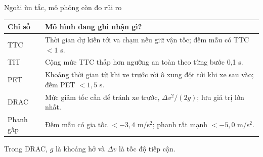 \documentclass[aspectratio=169,10pt]{beamer}
\begin{document}
  \begin{frame}{Ngoài ùn tắc, mô phỏng còn đo rủi ro}
    \relax
    \small
    \begin{tabular}{@{}P{2.3cm}P{10.3cm}@{}}
      \toprule
      Chỉ số & Mô hình đang ghi nhận gì?\\
      \midrule
      TTC & Thời gian dự kiến tới va chạm nếu giữ vận tốc; đếm mẫu có TTC $<1$ s.\\
      TIT & Cộng mức TTC thấp hơn ngưỡng an toàn theo từng bước 0,1 s.\\
      PET & Khoảng thời gian từ khi xe trước rời ô xung đột tới khi xe sau vào; đếm PET $<1,5$ s.\\
      DRAC & Mức giảm tốc cần để tránh xe trước, $\Delta v^2/(2g)$; lưu giá trị lớn nhất.\\
      Phanh gấp & Đếm mẫu có gia tốc $<-3,4$ m/s$^2$; phanh rất mạnh $<-5,0$ m/s$^2$.\\
      \bottomrule
    \end{tabular}
    \par
    \vspace{.2cm}
    Trong DRAC, $g$ là khoảng hở và $\Delta v$ là tốc độ tiếp cận.\par
    \vspace{.2cm}
  \end{frame}
\end{document}

